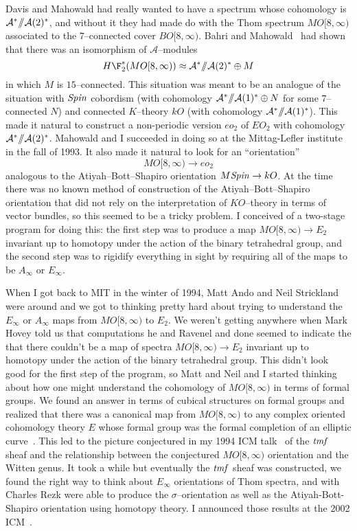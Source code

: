 Davis and Mahowald had really wanted to have a spectrum whose cohomology
is $\mathcal A^* /\!\!/ \mathcal A(2)^*$, and without it they had made do
with the Thom spectrum $MO[8, \infty)$ associated to the $7$--connected cover
$BO[8, \infty)$.  Bahri and Mahowald~\cite{BahriMahowald} had shown that
there was an isomorphism of $\mathcal A$--modules
\[
H\F_2^{\ast}(MO[8, \infty)) \approx \mathcal A^* \mmod \mathcal A(2)^* \oplus M
\]
in which $M$ is $15$--connected.  This situation was meant to be an
analogue of the situation with $\mathit{Spin}$ cobordism (with cohomology
$\mathcal A^* /\!\!/ \mathcal A(1)^* \oplus N$ for some $7$--connected $N$) and connected
$K$--theory $kO$ (with cohomology $\mathcal A^* /\!\!/ \mathcal A(1)^*$).  This made it
natural to construct a non-periodic version $eo_{2}$ of $EO_{2}$ with
cohomology $\mathcal A^* /\!\!/ \mathcal A(2)^*$.  Mahowald and I succeeded in doing so at
the Mittag-Lefler institute in the fall of 1993.  It also made it
natural to look for an ``orientation'' \[MO[8, \infty) \to eo_{2}\] analogous
to the Atiyah--Bott--Shapiro orientation $M\mathit{Spin} \to kO$.  At the time
there was no known method of construction of the Atiyah--Bott--Shapiro
orientation that did not rely on the interpretation of $KO$--theory in
terms of vector bundles, so this seemed to be a tricky problem.  I
conceived of a two-stage program for doing this: the first step was
to produce a map $MO[8, \infty) \to E_{2}$ invariant up to homotopy under
the action of the binary tetrahedral group, and the second step was to
rigidify everything in sight by requiring all of the maps to be
$A_{\infty}$ or $E_{\infty}$.

When I got back to MIT in the winter of 1994, Matt Ando and Neil
Strickland were around and we got to thinking pretty hard about trying
to understand the $E_{\infty}$ or $A_{\infty}$ maps from $MO[8, \infty)$ to
$E_{2}$.  We weren't getting anywhere when Mark Hovey told us that
computations he and Ravenel and done seemed to indicate the that there
couldn't be a map of spectra $MO[8, \infty) \to E_{2}$ invariant up to
homotopy under the action of the binary tetrahedral group.  This
didn't look good for the first step of the program, so Matt and Neil
and I started thinking about how one might understand the cohomology
of $MO[8, \infty)$ in terms of formal groups.  We found an answer in terms
of cubical structures on formal groups and realized that there was a
canonical map from $MO[8, \infty)$ to any complex oriented cohomology
theory $E$ whose formal group was the formal completion of an elliptic
curve~\cite{AHSTheoremOfTheCube}.  This led to the picture
conjectured in my 1994 ICM talk~\cite{HopkinsICMZurich} of the
$\mathit{tmf}$ sheaf and the relationship between the conjectured $MO[8, \infty)$
orientation and the Witten genus.  It took a while but eventually the
$\mathit{tmf}$ sheaf was constructed, we found the right way to think about
$E_{\infty}$ orientations of Thom spectra, and with Charles Rezk were
able to produce the $\sigma$--orientation as well as the
Atiyah-Bott-Shapiro orientation using homotopy theory.  I announced
those results at the 2002 ICM~\cite{HopkinsICMBeijing}.

